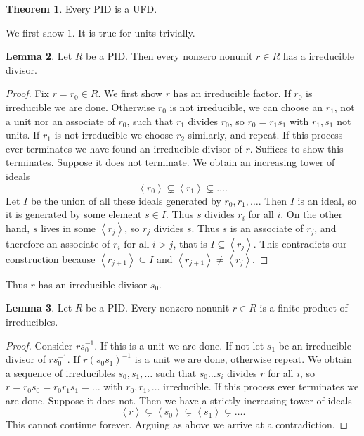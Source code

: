 \documentclass{article}
\newcommand{\rb}[1]{\left( #1 \right)}
\newcommand{\ab}[1]{\left\langle #1 \right\rangle}
\theoremstyle{definition}\newtheorem{definition}{Definition}[section]
\theoremstyle{definition}\newtheorem{remark}[definition]{Remark}
\theoremstyle{definition}\newtheorem*{example}{Example}
\theoremstyle{definition}\newtheorem*{note}{Note}
\newtheorem{lemma}[definition]{Lemma}
\newtheorem{theorem}[definition]{Theorem}
\begin{document}
\begin{theorem}
\label{thm:3.8}
Every PID is a UFD.
\end{theorem}

We first show $ 1 $. It is true for units trivially.

\begin{lemma}
Let $ R $ be a PID. Then every nonzero nonunit $ r \in R $ has a irreducible divisor.
\end{lemma}

\begin{proof}
Fix $ r = r_0 \in R $. We first show $ r $ has an irreducible factor. If $ r_0 $ is irreducible we are done. Otherwise $ r_0 $ is not irreducible, we can choose an $ r_1 $, not a unit nor an associate of $ r_0 $, such that $ r_1 $ divides $ r_0 $, so $ r_0 = r_1s_1 $ with $ r_1, s_1 $ not units. If $ r_1 $ is not irreducible we choose $ r_2 $ similarly, and repeat. If this process ever terminates we have found an irreducible divisor of $ r $. Suffices to show this terminates. Suppose it does not terminate. We obtain an increasing tower of ideals
$$ \ab{r_0} \subsetneq \ab{r_1} \subsetneq \dots. $$
Let $ I $ be the union of all these ideals generated by $ r_0, r_1, \dots $. Then $ I $ is an ideal, so it is generated by some element $ s \in I $. Thus $ s $ divides $ r_i $ for all $ i $. On the other hand, $ s $ lives in some $ \ab{r_j} $, so $ r_j $ divides $ s $. Thus $ s $ is an associate of $ r_j $, and therefore an associate of $ r_i $ for all $ i > j $, that is $ I \subseteq \ab{r_j} $. This contradicts our construction because $ \ab{r_{j + 1}} \subseteq I $ and $ \ab{r_{j + 1}} \ne \ab{r_j} $.
\end{proof}

Thus $ r $ has an irreducible divisor $ s_0 $.

\begin{lemma}
Let $ R $ be a PID. Every nonzero nonunit $ r \in R $ is a finite product of irreducibles.
\end{lemma}

\begin{proof}
Consider $ rs_0^{-1} $. If this is a unit we are done. If not let $ s_1 $ be an irreducible divisor of $ rs_0^{-1} $. If $ r\rb{s_0s_1}^{-1} $ is a unit we are done, otherwise repeat. We obtain a sequence of irreducibles $ s_0, s_1, \dots $ such that $ s_0 \dots s_i $ divides $ r $ for all $ i $, so $ r = r_0s_0 = r_0r_1s_1 = \dots $ with $ r_0, r_1, \dots $ irreducible. If this process ever terminates we are done. Suppose it does not. Then we have a strictly increasing tower of ideals
$$ \ab{r} \subsetneq \ab{s_0} \subsetneq \ab{s_1} \subsetneq \dots. $$
This cannot continue forever. Arguing as above we arrive at a contradiction.
\end{proof}
\end{document}
